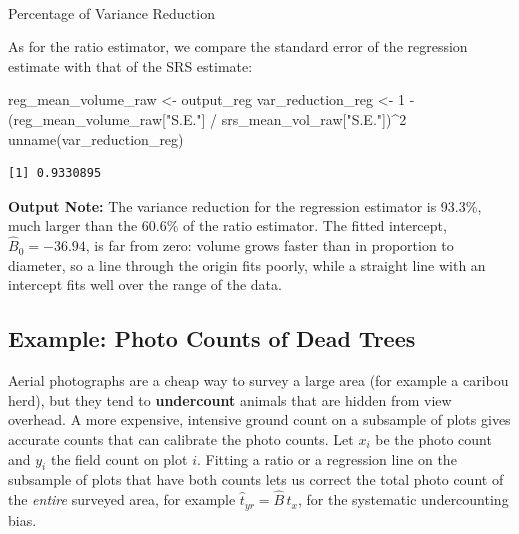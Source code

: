 \documentclass[
  letterpaper,
  DIV=11,
  numbers=noendperiod]{scrreprt}
\makeatletter
\let\oldparagraph\paragraph
\renewcommand{\paragraph}{
    \@ifstar
      \xxxParagraphStar
      \xxxParagraphNoStar
  }
\newcommand{\xxxParagraphStar}[1]{\oldparagraph*{#1}\mbox{}}
\newcommand{\xxxParagraphNoStar}[1]{\oldparagraph{#1}\mbox{}}
\newenvironment{Shaded}{\begin{snugshade}}{\end{snugshade}}
\newcommand{\DecValTok}[1]{\textcolor[rgb]{0.68,0.00,0.00}{#1}}
\newcommand{\FunctionTok}[1]{\textcolor[rgb]{0.28,0.35,0.67}{#1}}
\newcommand{\NormalTok}[1]{\textcolor[rgb]{0.00,0.23,0.31}{#1}}
\newcommand{\OtherTok}[1]{\textcolor[rgb]{0.00,0.23,0.31}{#1}}
\newcommand{\SpecialCharTok}[1]{\textcolor[rgb]{0.37,0.37,0.37}{#1}}
\newcommand{\StringTok}[1]{\textcolor[rgb]{0.13,0.47,0.30}{#1}}
\renewcommand{\[}{\begin{equation}}
\renewcommand{\]}{\end{equation}}
\makeatother
\begin{document}
\paragraph{Percentage of Variance
Reduction}\label{percentage-of-variance-reduction-1}

As for the ratio estimator, we compare the standard error of the
regression estimate with that of the SRS estimate:

\begin{Shaded}
\begin{Highlighting}[]
\NormalTok{reg\_mean\_volume\_raw }\OtherTok{\textless{}{-}}\NormalTok{ output\_reg}
\NormalTok{var\_reduction\_reg }\OtherTok{\textless{}{-}} \DecValTok{1} \SpecialCharTok{{-}}\NormalTok{ (reg\_mean\_volume\_raw[}\StringTok{"S.E."}\NormalTok{] }\SpecialCharTok{/}\NormalTok{ srs\_mean\_vol\_raw[}\StringTok{"S.E."}\NormalTok{])}\SpecialCharTok{\^{}}\DecValTok{2}
\FunctionTok{unname}\NormalTok{(var\_reduction\_reg)}
\end{Highlighting}
\end{Shaded}

\begin{verbatim}
[1] 0.9330895
\end{verbatim}

\textbf{Output Note:} The variance reduction for the regression
estimator is 93.3\%, much larger than the 60.6\% of the ratio estimator.
The fitted intercept, \(\hat B_0 = -36.94\), is far from zero: volume
grows faster than in proportion to diameter, so a line through the
origin fits poorly, while a straight line with an intercept fits well
over the range of the data.

\subsection{Example: Photo Counts of Dead
Trees}\label{example-photo-counts-of-dead-trees}

Aerial photographs are a cheap way to survey a large area (for example a
caribou herd), but they tend to \textbf{undercount} animals that are
hidden from view overhead. A more expensive, intensive ground count on a
subsample of plots gives accurate counts that can calibrate the photo
counts. Let \(x_i\) be the photo count and \(y_i\) the field count on
plot \(i\). Fitting a ratio or a regression line on the subsample of
plots that have both counts lets us correct the total photo count of the
\emph{entire} surveyed area, for example \(\hat t_{yr} = \hat B\,t_x\),
for the systematic undercounting bias.
\end{document}
